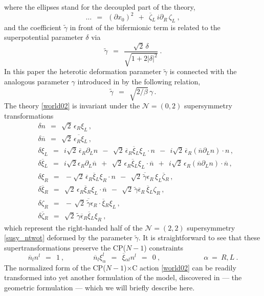 \documentclass[12pt]{article}
\newcommand{\ntwot}{${\mathcal N}= \left(2,2\right) $ }
\newcommand{\ntwoo}{${\mathcal N}= \left(0,2\right) $ }
\newcommand{\p}{\partial}
\newcommand{\wt}{\widetilde}
\newcommand{\ov}{\overline}
\newcommand{\bxir}{\ov{\xi}{}_R}
\newcommand{\bxil}{\ov{\xi}{}_L}
\newcommand{\xir}{\xi_R}
\newcommand{\xil}{\xi_L}
\newcommand{\bzl}{\ov{\zeta}{}_L}
\newcommand{\bzr}{\ov{\zeta}{}_R}
\newcommand{\zr}{\zeta_R}
\newcommand{\zl}{\zeta_L}
\newcommand{\CPC}{CP($N-1$)$\times$C }
\newcommand{\tgamma}{\wt{\gamma}}
\begin{document}
	where the ellipses stand  for the decoupled part of the theory,
\[
	\dots ~~=~~ \left(\p x_0\right)^2 ~~+~~ \bzl\, i\p_R\, \zl ~,
\]
	and the coefficient $ \tgamma $ in front of the bifermionic term is related to the superpotential parameter $ \delta $ via
\[
	\tgamma ~~=~~ \frac { \sqrt{2}\,\delta } { \sqrt{ 1 +  2 |\delta|^2 } }~.
\]
	In this paper the heterotic deformation parameter $ \tgamma $ is connected with the analogous parameter
	$ \gamma $ introduced in \cite{SYhet} by the following relation,
\[
	\tgamma ~~=~~ \sqrt{2/\beta}\, \gamma\,.
\]
	The theory \eqref{world02} is invariant under the \ntwoo supersymmetry transformations
\begin{align*}
%
	&
	\delta n ~~=~~ \sqrt{2}\, \epsilon_R \xil \,, \\[2mm]
%
	&
	 \delta\ov{n} ~~=~~ \sqrt{2}\, \ov{\epsilon_R \xi}{}_L\,,
	\\[2mm]
%
	&
	\delta\xil ~~=~~ i\sqrt{2}\, \ov{\epsilon}{}_R \p_L n ~~-~~ 
			\sqrt{2}\, \ov{\epsilon}{}_R \bxil\xil \cdot n ~~-~~
			i\sqrt{2}\, \ov{\epsilon}{}_R \left( \ov{n}\p_L n \right) \cdot n \,,\\[2mm]
%
	&
	\delta\bxil ~~=~~ i\sqrt{2}\epsilon_R \p_L \ov{n}  ~~+~~
			\sqrt{2}\,\epsilon_R \bxil\xil \cdot \ov{n} ~~+~~
			i\sqrt{2}\, \epsilon_R \left( \ov{n} \p_L n \right) \cdot \ov{n}\,, \\[2mm]
%
	& 
	\delta\xir ~~=~~ - \sqrt{2}\, \ov{\epsilon}{}_R \bxil\xir \cdot n 
		~~-~~ \sqrt{2}\, \ov{\tgamma}\epsilon_R\, \xil \bzr \,,\\[2mm]
%
	&
	\delta\bxir  ~~=~~ \sqrt{2}\, \epsilon_R \bxir \xil \cdot \ov{n} 
		~~-~~ \sqrt{2}\, \tgamma\ov{\epsilon}{}_R\, \bxil\zr \,,\\[2mm]
%
	&
	\delta\zeta_R ~~=~~ -\, \sqrt{2}\, \ov{\tgamma}\epsilon_R \cdot \bxir\xil \,,\\[2mm]
%
	&
	\delta\ov{\zeta}{}_R ~~=~~ \sqrt{2}\, \tgamma \ov{\epsilon}{}_R \bxil\xir~,
\end{align*}
	which represent the right-handed half of the \ntwot supersymmetry \eqref{susy_ntwot} 
	deformed by the parameter $ \tgamma $.
	It is straightforward to see that these supertransformations preserve the CP($N-1$) constraints
\[
	\ov{n}{}_l n^l ~~=~~ 1~, \qquad\qquad  \ov{n}{}_l\xi_\alpha^l ~~=~~ \ov{\xi}{}_{\alpha l} n^l ~~=~~ 0~,
		\qquad\qquad\qquad  \alpha ~=~ R,L~.
\]
The normalized form of the \CPC action \eqref{world02} can be readily transformed into yet another
	formulation of the model, discovered in \cite{SYhet} --- the geometric formulation --- which we  will briefly describe here.
\end{document}
